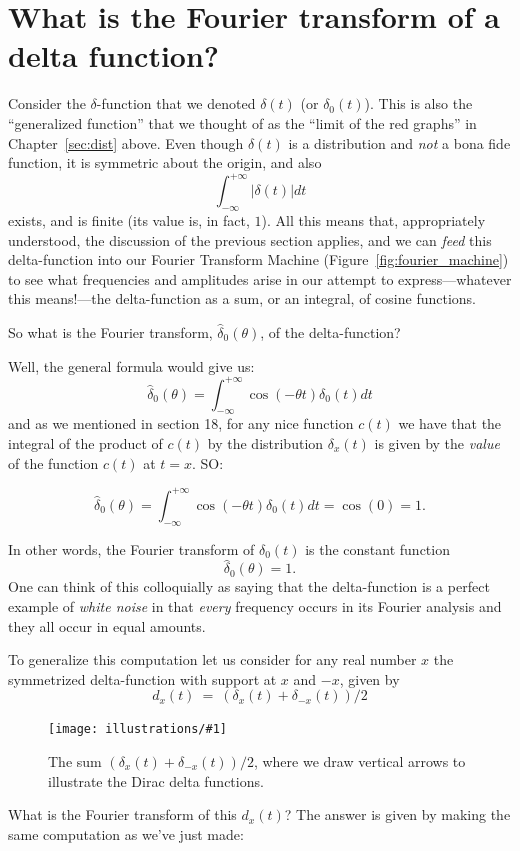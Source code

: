 \documentclass[openany]{book}
\newcommand{\ill}[3]{%
   \begin{figure}[H]%
   \vspace{-2ex}
   \centering%
   \texttt{[image: illustrations/\#1]}%
   \caption{#3}%
   \vspace{-2ex}
    \end{figure}}
\theoremstyle{plain}
\theoremstyle{definition}
\begin{document}
{{\chapter[Fourier transform of delta]{What is the Fourier transform of a delta function?\label{sec:ftdelta}}

Consider the $\delta$-function that we denoted $\delta(t)$ (or
$\delta_0(t)$). This is also the ``generalized function'' that we
thought of as the ``limit of the red graphs'' in Chapter~\ref{sec:dist}
above. Even though $\delta(t)$ is a distribution and {\it not} a bona
fide function, it is symmetric about the origin, and
also $$\int_{-{\infty}}^{+{\infty}}|\delta(t)|dt$$ exists, and is
finite (its value is, in fact, $1$). All this means that,
appropriately understood, the discussion of the previous section
applies, and we can {\it feed} this delta-function into our Fourier
Transform Machine (Figure~\ref{fig:fourier_machine}) to see what
frequencies and amplitudes arise in our attempt to express---whatever
this means!---the delta-function as a sum, or an integral, of cosine
functions.


     So what is the Fourier transform,  ${\hat \delta_0}(\theta)$, of the delta-function?


Well, the general formula would give us:
  $$ {\hat \delta_0}(\theta) = \int_{-\infty}^{+\infty}\cos(-\theta t)\delta_0(t)dt$$
  and as we mentioned in section 18, for any nice function $c(t)$ we
  have that the integral of the product of $c(t)$ by the distribution
  $\delta_x(t)$ is given by the {\it value} of the function $c(t)$ at
  $t=x$.  SO:

$$ {\hat \delta_0}(\theta) = \int_{-\infty}^{+\infty}\cos(-\theta t)\delta_0(t)dt = \cos(0) = 1.$$


In other words, the Fourier transform of $\delta_0(t)$ is the constant
function $$ {\hat \delta_0}(\theta)=1.$$ One can think of this
colloquially as saying that the delta-function is a perfect example of
{\it white noise} in that {\it every} frequency occurs in its Fourier
analysis and they all occur in equal amounts.

To generalize this computation let us consider for any real number $x$
the symmetrized delta-function with support at $x$ and $-x$, given
by $$d_x(t) \ = \ (\delta_x(t) + \delta_{-x}(t))/2$$


    \ill{two_delta}{0.4}{The sum $(\delta_x(t) + \delta_{-x}(t))/2$, where we draw vertical arrows to illustrate the Dirac delta functions.}

    What is the Fourier transform of this $d_x(t)$?  The answer is
    given by making the same computation as we've just made:

}}
\end{document}
